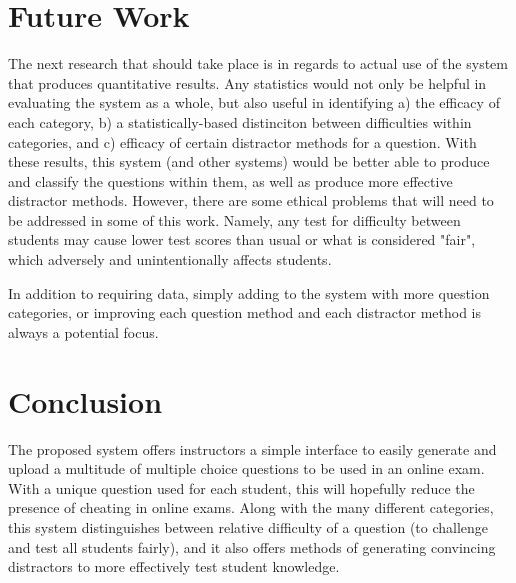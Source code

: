\documentclass{article}
\begin{document}
\section{Future Work}

The next research that should take place is in regards to actual use of the system that produces quantitative results. Any statistics would not only be helpful in evaluating the system as a whole, but also useful in identifying a) the efficacy of each category, b) a statistically-based distinciton between difficulties within categories, and c) efficacy of certain distractor methods for a question. With these results, this system (and other systems) would be better able to produce and classify the questions within them, as well as produce more effective distractor methods. However, there are some ethical problems that will need to be addressed in some of this work. Namely, any test for difficulty between students may cause lower test scores than usual or what is considered "fair", which adversely and unintentionally affects students. 

In addition to requiring data, simply adding to the system with more question categories, or improving each question method and each distractor method is always a potential focus.

\section{Conclusion}

The proposed system offers instructors a simple interface to easily generate and upload a multitude of multiple choice questions to be used in an online exam. With a unique question used for each student, this will hopefully reduce the presence of cheating in online exams. Along with the many different categories, this system distinguishes between relative difficulty of a question (to challenge and test all students fairly), and it also offers methods of generating convincing distractors to more effectively test student knowledge. 
\end{document}
